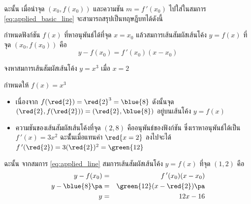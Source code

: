 \begin{frame}
ฉะนั้น เมื่อนำจุด $(x_0, f(x_0))$ และความชัน $m = f\,'(x_0)$ ไปใส่ในสมการ \eqref{eq:applied_basic_line} จะสามารถสรุปเป็นทฤษฎีบทได้ดังนี้
\begin{thm}{}{}
กำหนดฟังก์ชัน $f(x)$ ที่หาอนุพันธ์ได้ที่จุด $x=x_0$ \pa แล้วสมการเส้นสัมผัสเส้นโค้ง $y = f(x)$ ที่จุด $(x_0, f(x_0))$ \pa คือ
\begin{equation} \label{eq:applied_line}
 y - f(x_0) = f\,'(x_0)(x-x_0)
 \end{equation}
\end{thm}
\end{frame}


\begin{frame}[t]
\begin{ex}
จงหาสมการเส้นสัมผัสเส้นโค้ง $y = x^3$ เมื่อ $x=2$
\end{ex}
\begin{sol} กำหนดให้ $f(x) = x^3$
\begin{itemize}
\item เนื่องจาก $f(\red{2}) = \red{2}^3 = \blue{8}$ \pa ดังนั้นจุด $(\red{2}, f(\red{2})) = (\red{2},\blue{8})$ อยู่บนเส้นโค้ง $y = f(x)$ \pa
\item ความชันของเส้นสัมผัสเส้นโค้งที่จุด $(2, 8)$ คืออนุพันธ์ของฟังก์ชัน \pa ซึ่งเราหาอนุพันธ์ได้เป็น $f\,'(x) = 3x^2$ \pa ฉะนัั้นเมื่อแทนค่า $\red{x=2}$ ลงไปจะได้ $f\,'(\red{2}) = 3(\red{2})^2 = \green{12}$ \pa
\end{itemize}
ฉะนั้น จากสมการ \eqref{eq:applied_line} สมการเส้นสัมผัสเส้นโค้ง $y = f(x)$ ที่จุด $(1,2)$ คือ \pa
\begin{eqnarray*}
y - f(x_0) &=& f\,'(x_0) (x-x_0) \\
y - \blue{8} \pa &=& \green{12}(x - \red{2}) \pa \\
y &=& 12x-16
\end{eqnarray*}
\end{sol}
\end{frame}

\begin{frame}
\end{frame}


